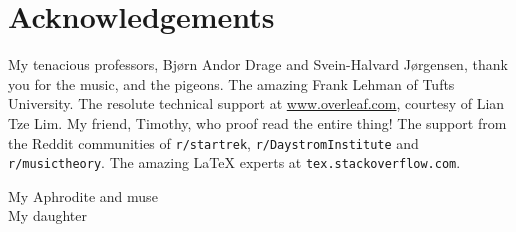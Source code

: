 
\thispagestyle{empty}
\chapter*{Acknowledgements}

\begin{fullwidth}
My tenacious professors, Bjørn Andor Drage and Svein-Halvard Jørgensen, thank you for the music, and the pigeons.
The amazing Frank Lehman of Tufts University. 
The resolute technical support at \url{www.overleaf.com}, courtesy of Lian Tze Lim. 
My friend, Timothy, who proof read the entire thing!
The support from the Reddit communities of \texttt{r/startrek}, \texttt{r/DaystromInstitute} and \texttt{r/musictheory}.
The amazing \LaTeX{} experts at \texttt{tex.stackoverflow.com}.

\vspace{0.5cm}

\noindent My Aphrodite and muse
\\
\noindent My daughter

\end{fullwidth}


